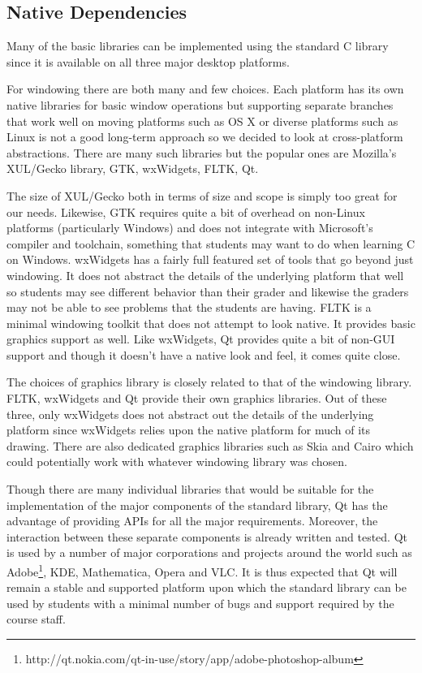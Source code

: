\subsection{Native Dependencies}

Many of the basic libraries can be implemented using the standard C library
since it is available on all three major desktop platforms.

For windowing there are both many and few choices. Each platform has its own
native libraries for basic window operations but supporting separate branches
that work well on moving platforms such as OS X or diverse platforms such as
Linux is not a good long-term approach so we decided to look at cross-platform
abstractions. There are many such libraries but the popular ones are Mozilla's
XUL/Gecko library, GTK, wxWidgets, FLTK, Qt.

The size of XUL/Gecko both in terms of size and scope is simply too great for
our needs. Likewise, GTK requires quite a bit of overhead on non-Linux
platforms (particularly Windows) and does not integrate with Microsoft's
compiler and toolchain, something that students may want to do when learning C
on Windows. wxWidgets has a fairly full featured set of tools that go beyond
just windowing. It does not abstract the details of the underlying platform
that well so students may see different behavior than their grader and likewise
the graders may not be able to see problems that the students are having. FLTK
is a minimal windowing toolkit that does not attempt to look native. It
provides basic graphics support as well. Like wxWidgets, Qt provides quite a
bit of non-GUI support and though it doesn't have a native look and feel, it
comes quite close.

The choices of graphics library is closely related to that of the windowing
library. FLTK, wxWidgets and Qt provide their own graphics libraries. Out of
these three, only wxWidgets does not abstract out the details of the underlying
platform since wxWidgets relies upon the native platform for much of its
drawing. There are also dedicated graphics libraries such as Skia and Cairo
which could potentially work with whatever windowing library was chosen.

Though there are many individual libraries that would be suitable for the
implementation of the major components of the standard library, Qt has the
advantage of providing APIs for all the major requirements. Moreover, the
interaction between these separate components is already written and tested. Qt
is used by a number of major corporations and projects around the world such as
Adobe\footnote{http://qt.nokia.com/qt-in-use/story/app/adobe-photoshop-album},
KDE, Mathematica, Opera and VLC. It is thus expected that Qt will remain a
stable and supported platform upon which the standard library can be used by
students with a minimal number of bugs and support required by the course staff.

